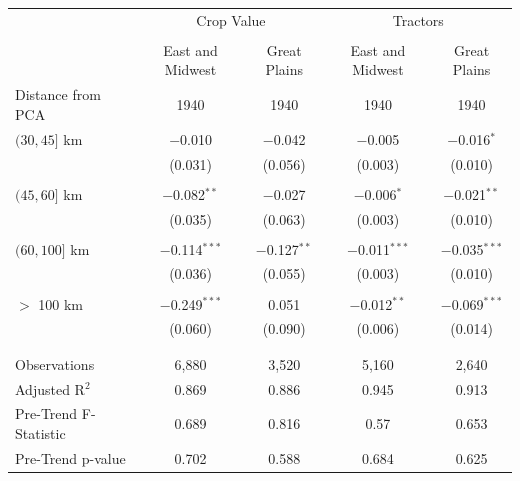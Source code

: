 \documentclass[12pt]{article}
\begin{document}
\begin{appendices}
\begin{table}
\begin{threeparttable}[t]
\begin{tabular}{lcccc}
& \multicolumn{2}{c}{Crop Value}   & \multicolumn{2}{c}{Tractors}      \\
                 \cline{2-5} \\ 
                 & East and Midwest& Great Plains   & East and Midwest& Great Plains    \\
Distance from PCA& 1940            & 1940           & 1940            & 1940  \\ \hline
$(30, 45]$ km    & $-$0.010        & $-$0.042       & $-$0.005        & $-$0.016$^{*}$  \\
                 & (0.031)         & (0.056)        & (0.003)         & (0.010)         \\
                 &                 &                &                 & \\
$(45, 60]$ km    & $-$0.082$^{**}$ & $-$0.027       & $-$0.006$^{*}$  & $-$0.021$^{**}$ \\
                 & (0.035)         & (0.063)        & (0.003)         & (0.010)         \\
                 &                 &                &                 & \\
$(60, 100]$ km   & $-$0.114$^{***}$& $-$0.127$^{**}$& $-$0.011$^{***}$& $-$0.035$^{***}$\\
                 & (0.036)         & (0.055)        & (0.003)         & (0.010)         \\
                 &                 &                &                 & \\
$>$ 100 km       & $-$0.249$^{***}$& 0.051          & $-$0.012$^{**}$ & $-$0.069$^{***}$\\
                 & (0.060)         & (0.090)        & (0.006)         & (0.014)         \\
                 &                 &                &                 & \\\hline \\[-1.8ex]
  Observations                      &  6,880          &  3,520         & 5,160           &  2,640          \\
  Adjusted R$^{2}$                  &  0.869          &  0.886         & 0.945           &  0.913          \\
  Pre-Trend F-Statistic             &  0.689          &  0.816         & 0.57            &  0.653          \\
  Pre-Trend p-value                 &  0.702          &  0.588         & 0.684           &  0.625          \\ \hline 
  \hline 
\end{tabular}


\end{threeparttable}
\end{table}
\end{appendices}
\end{document}
